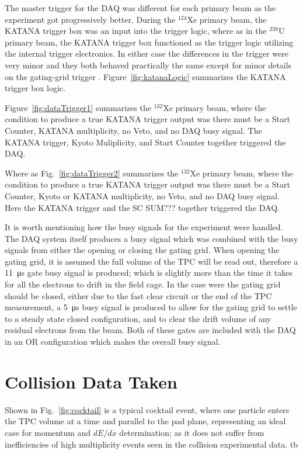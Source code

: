 The master trigger for the DAQ was different for each primary beam as the experiment got progressively better. During the ${}^{124}$Xe primary beam, the KATANA trigger box was an input into the trigger logic, where as in the ${}^{238}$U primary beam, the KATANA trigger box functioned as the trigger logic utilizing the internal trigger electronics. In either case the differences in the trigger were very minor and they both behaved practically the same except for minor details on the gating-grid trigger \cite{jon}. Figure~\ref{fig:katanaLogic} summarizes the KATANA trigger box logic. 

Figure~\ref{fig:dataTrigger1} summarizes the ${}^{132}$Xe primary beam, where the condition to produce a true KATANA trigger output was there must be a Start Counter, KATANA multiplicity, no Veto, and no DAQ busy signal. The KATANA trigger, Kyoto Muliplicity, and Start Counter together triggered the DAQ. 

 Where as Fig.~\ref{fig:dataTrigger2} summarizes the ${}^{132}$Xe primary beam, where the condition to produce a true KATANA trigger output was there must be a Start Counter, Kyoto or KATANA multiplicity, no Veto, and no DAQ busy signal. Here the KATANA trigger and the SC SUM??? together triggered the DAQ. 
 
 It is worth mentioning how the busy signals for the experiment were handled. The DAQ system itself produces a busy signal which was combined with the busy signals from either the opening or closing the gating grid. When opening the gating grid, it is assumed the full volume of the TPC will be read out, therefore  a \SI{11}{\micro\second} gate busy signal is produced; which is slightly more than the time it takes for all the electrons to drift in the field cage. In the case were the gating grid should be closed, either due to the fast clear circuit or the end of the TPC measurement, a \SI{5}{\micro\second} busy signal is produced to allow for the gating grid to settle to a steady state closed configuration, and to clear the drift volume of any residual electrons from the beam. Both of these gates are included with the DAQ in an OR configuration which makes the overall busy signal. 
 


\section{Collision Data Taken}

Shown in Fig.~\ref{fig:cocktail} is a typical cocktail event, where one particle enters the TPC volume at a time and parallel to the pad plane, representing an ideal case for momentum and $dE/dx$ determination; as it does not suffer from inefficiencies of high multiplicity events seen in the collision experimental data.  tb


